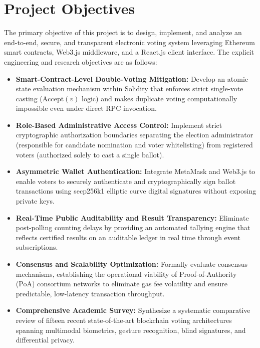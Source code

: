 \documentclass[12pt,a4paper]{report}
\begin{document}
\section{Project Objectives}
The primary objective of this project is to design, implement, and analyze an end-to-end, secure, and transparent electronic voting system leveraging Ethereum smart contracts, Web3.js middleware, and a React.js client interface. The explicit engineering and research objectives are as follows:
\begin{itemize}
    \item \textbf{Smart-Contract-Level Double-Voting Mitigation:} Develop an atomic state evaluation mechanism within Solidity that enforces strict single-vote casting ($\text{Accept}(v)$ logic) and makes duplicate voting computationally impossible even under direct RPC invocation.
    \item \textbf{Role-Based Administrative Access Control:} Implement strict cryptographic authorization boundaries separating the election administrator (responsible for candidate nomination and voter whitelisting) from registered voters (authorized solely to cast a single ballot).
    \item \textbf{Asymmetric Wallet Authentication:} Integrate MetaMask and Web3.js to enable voters to securely authenticate and cryptographically sign ballot transactions using secp256k1 elliptic curve digital signatures without exposing private keys.
    \item \textbf{Real-Time Public Auditability and Result Transparency:} Eliminate post-polling counting delays by providing an automated tallying engine that reflects certified results on an auditable ledger in real time through event subscriptions.
    \item \textbf{Consensus and Scalability Optimization:} Formally evaluate consensus mechanisms, establishing the operational viability of Proof-of-Authority (PoA) consortium networks to eliminate gas fee volatility and ensure predictable, low-latency transaction throughput.
    \item \textbf{Comprehensive Academic Survey:} Synthesize a systematic comparative review of fifteen recent state-of-the-art blockchain voting architectures spanning multimodal biometrics, gesture recognition, blind signatures, and differential privacy.
\end{itemize}
\end{document}
